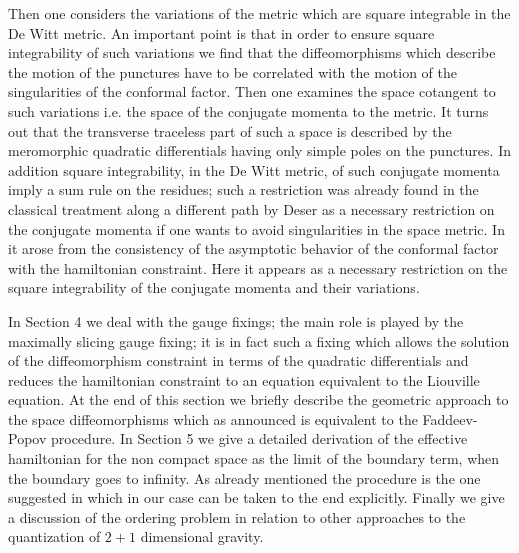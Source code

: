 \documentclass[a4paper,12pt]{article}
\begin{document}
Then one considers the variations of the metric which are square
integrable in the De Witt metric. An important point is that in order
to ensure square integrability of such variations we find that the
diffeomorphisms which describe the motion of the punctures have to be
correlated with the motion of the singularities of the conformal
factor. Then one examines the space cotangent to such variations
i.e. the space of the conjugate momenta to the metric. It turns out
that the transverse traceless part of such a space is described by the
meromorphic quadratic differentials having only simple poles on the
punctures. In addition square integrability, in the De Witt metric, of
such conjugate momenta imply a sum rule on the residues; such a
restriction was already found in the classical treatment along a
different path by Deser \cite{deser} as a
necessary restriction on the conjugate momenta if one wants to avoid
singularities in the space metric. In \cite{CMS1,MS1} it arose from
the consistency of the asymptotic behavior of the conformal factor
with the hamiltonian constraint. Here it appears as a necessary
restriction on the square integrability of the conjugate momenta and
their variations.

In Section 4 we deal with the gauge fixings; the main role is played
by the maximally slicing gauge fixing; it is in fact such a fixing
which allows the solution of the diffeomorphism constraint in terms of
the quadratic differentials and reduces the hamiltonian constraint to
an equation equivalent to the Liouville equation.  At the end of this
section we briefly describe the geometric approach to the space
diffeomorphisms which as announced is equivalent to the Faddeev-Popov
procedure. In Section 5 we give a detailed derivation of the effective
hamiltonian for the non compact space as the limit of the boundary
term, when the boundary goes to infinity. As already mentioned the
procedure is the one suggested in \cite{hawkinghunter} which in our
case can be taken to the end explicitly. Finally we give a discussion
of the ordering problem in relation to other approaches to the
quantization of $2+1$ dimensional gravity.

    
\end{document}
